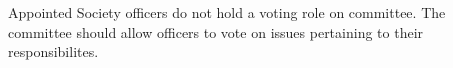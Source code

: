 \begin{clause}
    Appointed Society officers do not hold a voting role on committee. The committee should allow officers to vote on issues pertaining to their responsibilites.
\end{clause}